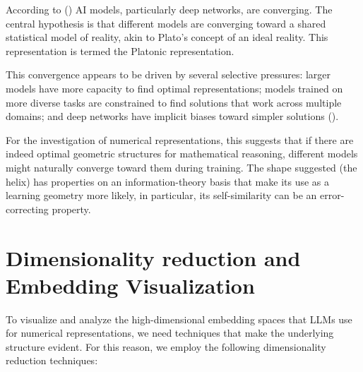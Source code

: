 \documentclass[
  a4paper, twoside, 10pt, titlepage]{book}
\begin{document}
According to () AI models,
particularly deep networks, are converging. The central hypothesis is
that different models are converging toward a shared statistical model
of reality, akin to Plato's concept of an ideal reality. This
representation is termed the Platonic representation.

This convergence appears to be driven by several selective pressures:
larger models have more capacity to find optimal representations; models
trained on more diverse tasks are constrained to find solutions that
work across multiple domains; and deep networks have implicit biases
toward simpler solutions ().

For the investigation of numerical representations, this suggests that
if there are indeed optimal geometric structures for mathematical
reasoning, different models might naturally converge toward them during
training. The shape suggested (the helix) has properties on an
information-theory basis that make its use as a learning geometry more
likely, in particular, its self-similarity can be an error-correcting
property.

\section{Dimensionality reduction and Embedding
Visualization}\label{dimensionality-reduction-and-embedding-visualization}

To visualize and analyze the high-dimensional embedding spaces that LLMs
use for numerical representations, we need techniques that make the
underlying structure evident. For this reason, we employ the following
dimensionality reduction techniques:
\end{document}
